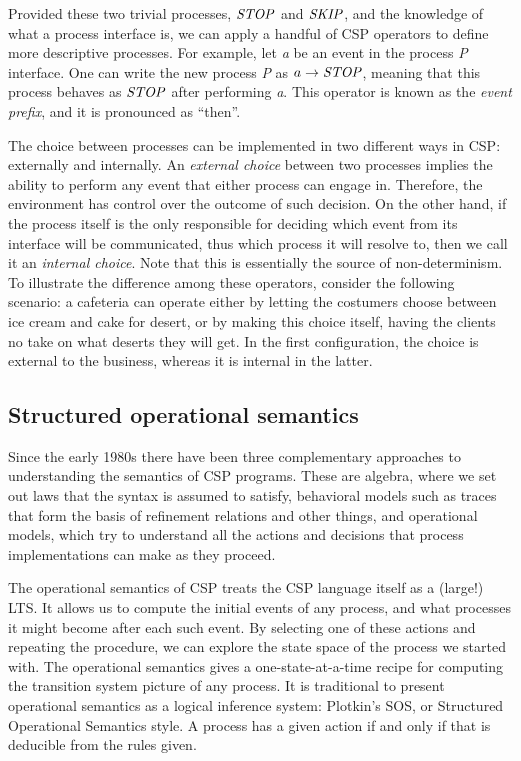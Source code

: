 Provided these two trivial processes, $ \mathit{\mathord{{STOP}}} $ and $ \mathit{\mathord{{SKIP}}} $, and the knowledge of what a process interface is, we can apply a handful of CSP operators to define more descriptive processes. For example, let \emph{a} be an event in the process \emph{P} interface. One can write the new process \emph{P} as $ a \mathrel{\rightarrow} \mathit{\mathord{{STOP}}} $, meaning that this process behaves as $ \mathit{\mathord{{STOP}}} $ after performing \emph{a}. This operator is known as the \emph{event prefix}, and it is pronounced as ``then''.

The choice between processes can be implemented in two different ways in CSP: externally and internally. An \emph{external choice} between two processes implies the ability to perform any event that either process can engage in. Therefore, the environment has control over the outcome of such decision. On the other hand, if the process itself is the only responsible for deciding which event from its interface will be communicated, thus which process it will resolve to, then we call it an \emph{internal choice}. Note that this is essentially the source of non-determinism. To illustrate the difference among these operators, consider the following scenario: a cafeteria can operate either by letting the costumers choose between ice cream and cake for desert, or by making this choice itself, having the clients no take on what deserts they will get. In the first configuration, the choice is external to the business, whereas it is internal in the latter.

\subsection{Structured operational semantics}

Since the early 1980s there have been three complementary approaches to understanding the semantics of CSP programs. These are algebra, where we set out laws that the syntax is assumed to satisfy, behavioral models such as traces that form the basis of refinement relations and other things, and operational models, which try to understand all the actions and decisions that process implementations can make as they proceed.

The operational semantics of CSP treats the CSP language itself as a (large!) LTS. It allows us to compute the initial events of any  process, and what processes it might become after each such event. By selecting one of these actions and repeating the procedure, we can explore the state space of the process we started with. The operational semantics gives a one-state-at-a-time recipe for computing the transition system picture of any process. It is traditional to present operational semantics as a logical inference system: Plotkin’s SOS, or Structured Operational Semantics style. A process has a given action if and only if that is deducible from the rules given.

